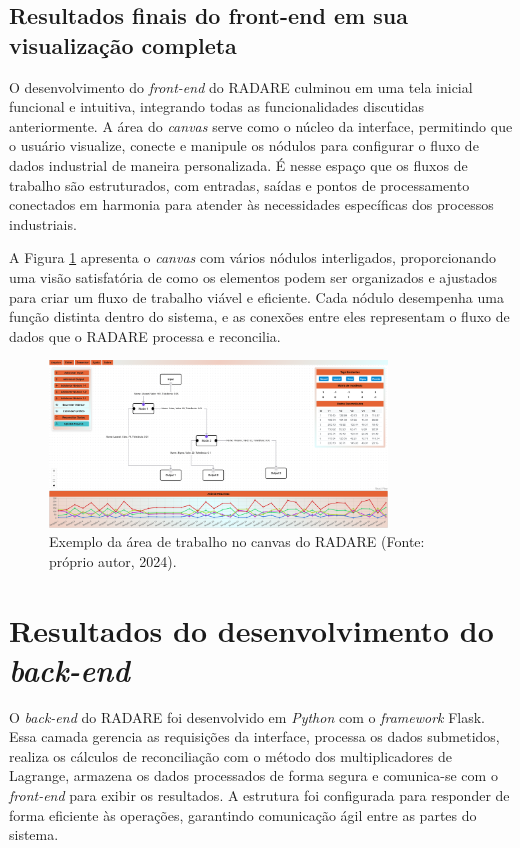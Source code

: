\subsection{Resultados finais do front-end em sua visualização completa}

O desenvolvimento do \textit{front-end} do RADARE culminou em uma tela inicial funcional e intuitiva, integrando todas as funcionalidades discutidas anteriormente. A área do \textit{canvas} serve como o núcleo da interface, permitindo que o usuário visualize, conecte e manipule os nódulos para configurar o fluxo de dados industrial de maneira personalizada. É nesse espaço que os fluxos de trabalho são estruturados, com entradas, saídas e pontos de processamento conectados em harmonia para atender às necessidades específicas dos processos industriais.

A Figura \ref{Fig:CanvasArea} apresenta o \textit{canvas} com vários nódulos interligados, proporcionando uma visão satisfatória de como os elementos podem ser organizados e ajustados para criar um fluxo de trabalho viável e eficiente. Cada nódulo desempenha uma função distinta dentro do sistema, e as conexões entre eles representam o fluxo de dados que o RADARE processa e reconcilia. 

\begin{figure}[htbp]
    \centering
    \includegraphics[width=0.8\textwidth]{figuras/interface-completa.png}
    \caption{Exemplo da área de trabalho no canvas do RADARE (Fonte: próprio autor, 2024).}
    \label{Fig:CanvasArea}
\end{figure}

\section{Resultados do desenvolvimento do \textit{back-end}}

O \textit{back-end} do RADARE foi desenvolvido em \textit{Python} com o \textit{framework} Flask. Essa camada gerencia as requisições da interface, processa os dados submetidos, realiza os cálculos de reconciliação com o método dos multiplicadores de Lagrange, armazena os dados processados de forma segura e comunica-se com o \textit{front-end} para exibir os resultados. A estrutura foi configurada para responder de forma eficiente às operações, garantindo comunicação ágil entre as partes do sistema.

